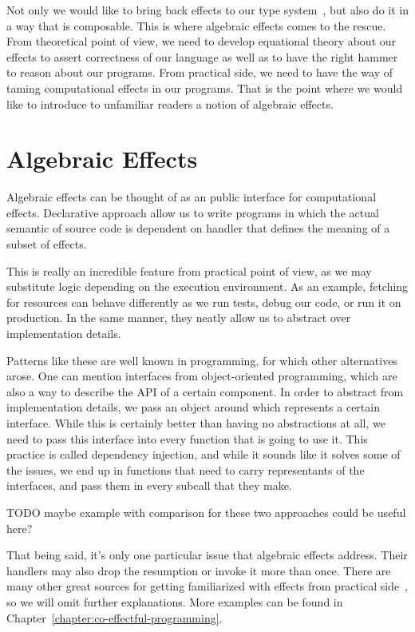 \documentclass[declaration,shortabstract]{iithesis}
\theoremstyle{definition} \newtheorem{definition}{Definition}[chapter]
\theoremstyle{remark} \newtheorem{remark}[definition]{Observation}
\theoremstyle{plain} \newtheorem{theorem}[definition]{Theorem}
\theoremstyle{plain} \newtheorem{lemma}[definition]{Lemma}
\begin{document}
Not only we would like to bring back effects to our type
system~\cite{type-and-effect}, but also do it in a way that is composable. This
is where algebraic effects comes to the rescue. From theoretical point of view,
we need to develop equational theory about our effects to assert correctness of
our language as well as to have the right hammer to reason about our programs.
From practical side, we need to have the way of taming computational effects
in our programs. That is the point where we would like to introduce to unfamiliar
readers a notion of algebraic effects.

\section{Algebraic Effects}

Algebraic effects can be thought of as an public interface for computational effects.
Declarative approach allow us to write programs in which the actual semantic of
source code is dependent on handler that defines the meaning of a subset of effects.

This is really an incredible feature from practical point of view, as we may substitute
logic depending on the execution environment. As an example, fetching for resources
can behave differently as we run tests, debug our code, or run it on production.
In the same manner, they neatly allow us to abstract over implementation details.

Patterns like these are well known in programming, for which other alternatives
arose. One can mention interfaces from object-oriented programming, which are also
a way to describe the API of a certain component. In order to abstract from
implementation details, we pass an object around which represents a certain
interface. While this is certainly better than having no abstractions at all,
we need to pass this interface into every function that is going to use it.
This practice is called dependency injection, and while it sounds like it solves
some of the issues, we end up in functions that need to carry representants
of the interfaces, and pass them in every subcall that they make.

\noindent
TODO maybe example with comparison for these two approaches could be useful here?

That being said, it's only one particular issue that algebraic effects address.
Their handlers may also drop the resumption or invoke it more than
once. There are many other great sources for getting familiarized with
effects from practical side~\cite{handlers-tutorial, programming-in-eff, koka-tutorial},
so we will omit further explanations. More examples can be found in
Chapter~\ref{chapter:co-effectful-programming}.
\end{document}
